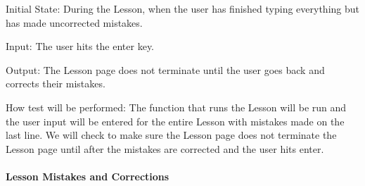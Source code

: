 \documentclass[12pt, titlepage]{article}
\begin{document}
\begin{enumerate}
{Initial State: During the Lesson, when the user has finished typing everything but has made uncorrected mistakes.
					
Input: The user hits the enter key.
					
Output: The Lesson page does not terminate until the user goes back and corrects their mistakes.
					
How test will be performed: The function that runs the Lesson will be run and the user input will be entered for the entire Lesson with mistakes made on the last line. We will check to make sure the Lesson page does not terminate the Lesson page until after the mistakes are corrected and the user hits enter.}

\end{enumerate}

\paragraph{Lesson Mistakes and Corrections}
\end{document}
